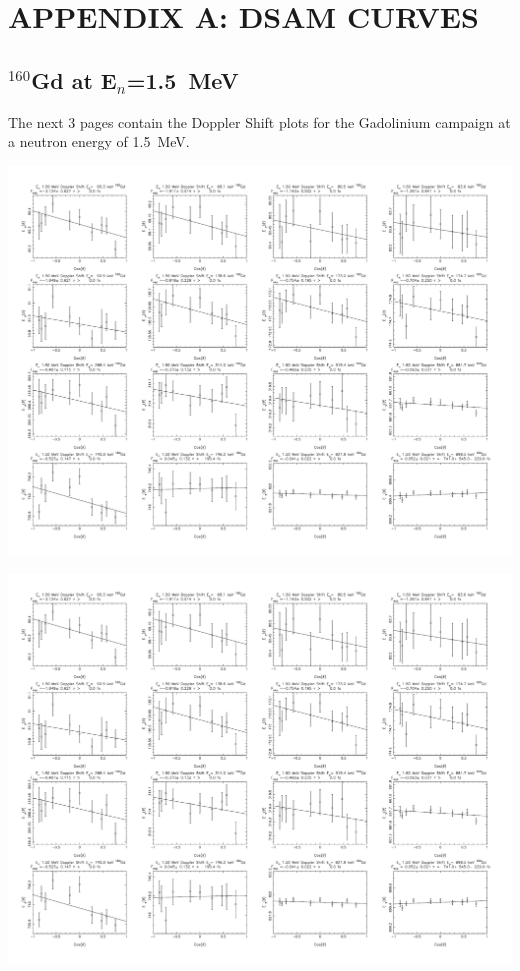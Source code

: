 \chapter{APPENDIX A: DSAM CURVES}
\section{$^{160}$Gd at E$_n$=1.5~MeV}\label{app:DSAM_Gd_15}
The next 3 pages contain the Doppler Shift plots for the Gadolinium campaign at a neutron energy of 1.5~MeV.
\newpage
\begin{center}
\includegraphics[page=1,angle=90,height=0.95\textheight]{160Gd_15_DSAM.pdf}
\end{center}
\begin{center}
\includegraphics[page=2,angle=90,height=0.95\textheight]{160Gd_15_DSAM.pdf}
\end{center}
